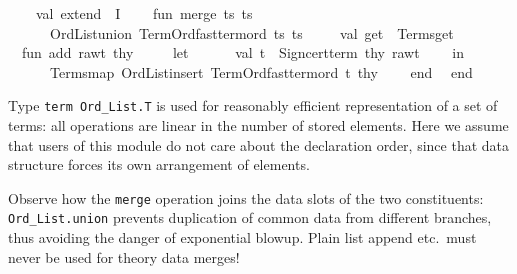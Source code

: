 \begin{isabellebody}
\ \ \ \ val\ extend\ {}\ I{}\isanewline
\ \ \ \ fun\ merge\ {}ts{}{}\ ts{}{}\ {}\isanewline
\ \ \ \ \ \ Ord{}List{}union\ Term{}Ord{}fast{}term{}ord\ ts{}\ ts{}{}\isanewline
\ \ {}{}\isanewline
\isanewline
\ \ val\ get\ {}\ Terms{}get{}\isanewline
\isanewline
\ \ fun\ add\ raw{}t\ thy\ {}\isanewline
\ \ \ \ let\isanewline
\ \ \ \ \ \ val\ t\ {}\ Sign{}cert{}term\ thy\ raw{}t{}\isanewline
\ \ \ \ in\isanewline
\ \ \ \ \ \ Terms{}map\ {}Ord{}List{}insert\ Term{}Ord{}fast{}term{}ord\ t{}\ thy\isanewline
\ \ \ \ end{}\isanewline
\isanewline
\ \ end{}\isanewline
{}%
\endisatagML
{\isafoldML}%
%
\isadelimML
%
\endisadelimML
%
\begin{isamarkuptext}%
Type \verb|term Ord_List.T| is used for reasonably
  efficient representation of a set of terms: all operations are
  linear in the number of stored elements.  Here we assume that users
  of this module do not care about the declaration order, since that
  data structure forces its own arrangement of elements.

  Observe how the \verb|merge| operation joins the data slots of
  the two constituents: \verb|Ord_List.union| prevents duplication of
  common data from different branches, thus avoiding the danger of
  exponential blowup.  Plain list append etc.\ must never be used for
  theory data merges!


\end{isamarkuptext}
\end{isabellebody}
